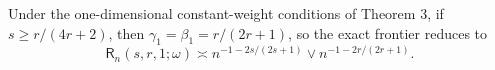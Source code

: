 Under the one-dimensional constant-weight conditions of Theorem 3, if \(s\ge r/(4r+2)\), then \(\gamma_1=\beta_1=r/(2r+1)\), so the exact frontier reduces to \[\mathsf R_n(s,r,1;\omega)\asymp n^{-1-2s/(2s+1)}\vee n^{-1-2r/(2r+1)}.\]